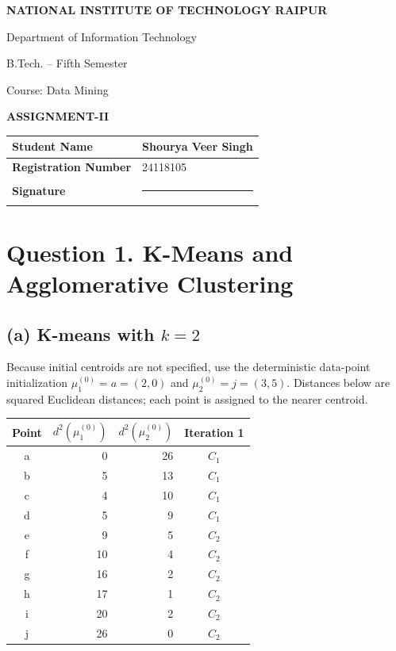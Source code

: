 \documentclass[11pt,a4paper]{article}
\newcommand{\StudentName}{Shourya Veer Singh}
\newcommand{\RegistrationNumber}{24118105}
\renewcommand{\arraystretch}{1.12}
\begin{document}
\begin{titlepage}
\thispagestyle{cover}
\vspace*{1.2cm}
\begin{center}
{\Large\bfseries NATIONAL INSTITUTE OF TECHNOLOGY RAIPUR\par}
\vspace{0.3cm}
{\large Department of Information Technology\par}
\vspace{0.2cm}
{\large B.Tech. -- Fifth Semester\par}
\vspace{0.8cm}
{\large Course: Data Mining\par}
\vspace{0.4cm}
{\LARGE\bfseries ASSIGNMENT-II\par}
\end{center}
\vfill
\begin{center}
\renewcommand{\arraystretch}{1.5}
\begin{tabular}{|>{\bfseries}p{4.2cm}|p{8.0cm}|}
\hline
Student Name & \StudentName\\ \hline
Registration Number & \RegistrationNumber\\ \hline
Signature & \rule{5.5cm}{0.4pt}\\ \hline
\end{tabular}
\end{center}
\vfill
\end{titlepage}
\setcounter{page}{1}

\section*{Question 1. K-Means and Agglomerative Clustering}

\subsection*{(a) K-means with \(k=2\)}
Because initial centroids are not specified, use the deterministic data-point initialization
\(\mu_1^{(0)}=a=(2,0)\) and \(\mu_2^{(0)}=j=(3,5)\).
Distances below are squared Euclidean distances; each point is assigned to the nearer centroid.

\begin{center}
\small
\begin{tabular}{c|r r|c}
\toprule
Point & \(d^2(\mu_1^{(0)})\) & \(d^2(\mu_2^{(0)})\) & Iteration 1\\
\midrule
a & 0 & 26 & \(C_1\)\\
b & 5 & 13 & \(C_1\)\\
c & 4 & 10 & \(C_1\)\\
d & 5 & 9 & \(C_1\)\\
e & 9 & 5 & \(C_2\)\\
f & 10 & 4 & \(C_2\)\\
g & 16 & 2 & \(C_2\)\\
h & 17 & 1 & \(C_2\)\\
i & 20 & 2 & \(C_2\)\\
j & 26 & 0 & \(C_2\)\\
\bottomrule
\end{tabular}
\end{center}
\end{document}
